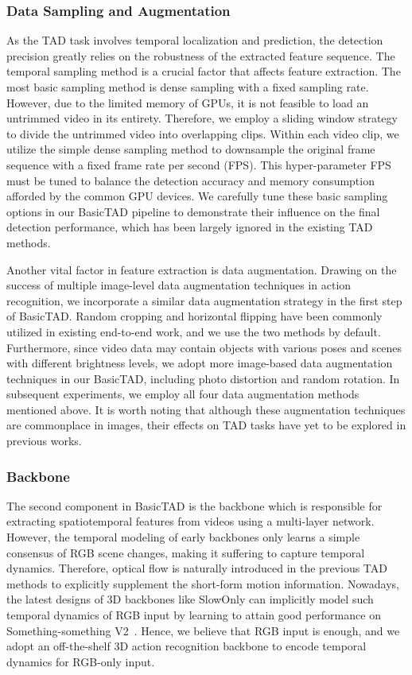 \documentclass[a4paper,fleqn]{cas-dc}
\begin{document}
\subsubsection{Data Sampling and Augmentation}
\label{sec:dataaugmentation}
As the TAD task involves temporal localization and prediction, the detection precision greatly relies on the robustness of the extracted feature sequence. The temporal sampling method is a crucial factor that affects feature extraction. The most basic sampling method is dense sampling with a fixed sampling rate. However, due to the limited memory of GPUs, it is not feasible to load an untrimmed video in its entirety. Therefore, we employ a sliding window strategy to divide the untrimmed video into overlapping clips. Within each video clip, we utilize the simple dense sampling method to downsample the original frame sequence with a fixed frame rate per second (FPS). This hyper-parameter FPS must be tuned to balance the detection accuracy and memory consumption afforded by the common GPU devices. We carefully tune these basic sampling options in our BasicTAD pipeline to demonstrate their influence on the final detection performance, which has been largely ignored in the existing TAD methods.

Another vital factor in feature extraction is data augmentation. Drawing on the success of multiple image-level data augmentation techniques in action recognition, we incorporate a similar data augmentation strategy in the first step of BasicTAD. Random cropping and horizontal flipping have been commonly utilized in existing end-to-end work, and we use the two methods by default. Furthermore, since video data may contain objects with various poses and scenes with different brightness levels, we adopt more image-based data augmentation techniques in our BasicTAD, including photo distortion and random rotation. In subsequent experiments, we employ all four data augmentation methods mentioned above. It is worth noting that although these augmentation techniques are commonplace in images, their effects on TAD tasks have yet to be explored in previous works.


\subsubsection{Backbone}
\label{sec:backbone}
The second component in BasicTAD is the backbone which is responsible for extracting spatiotemporal features from videos using a multi-layer network. However, the temporal modeling of early backbones only learns a simple consensus of RGB scene changes, making it suffering to capture temporal dynamics. 
Therefore, optical flow is naturally introduced in the previous TAD methods to explicitly supplement the short-form motion information. Nowadays, the latest designs of 3D backbones like SlowOnly can implicitly model such temporal dynamics of RGB input by learning to attain good performance on Something-something V2~\citep{sth-sth}. Hence, we believe that RGB input is enough, and we adopt an off-the-shelf 3D action recognition backbone to encode temporal dynamics for RGB-only input.
\end{document}
